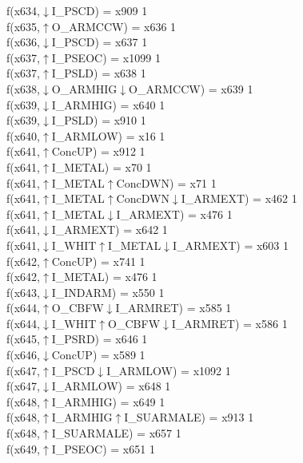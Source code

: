 f(x634,$\downarrow$I\_PSCD) = x909 {1} \\
f(x635,$\uparrow$O\_ARMCCW) = x636 {1} \\
f(x636,$\downarrow$I\_PSCD) = x637 {1} \\
f(x637,$\uparrow$I\_PSEOC) = x1099 {1} \\
f(x637,$\uparrow$I\_PSLD) = x638 {1} \\
f(x638,$\downarrow$O\_ARMHIG$\downarrow$O\_ARMCCW) = x639 {1} \\
f(x639,$\downarrow$I\_ARMHIG) = x640 {1} \\
f(x639,$\downarrow$I\_PSLD) = x910 {1} \\
f(x640,$\uparrow$I\_ARMLOW) = x16 {1} \\
f(x641,$\uparrow$ConcUP) = x912 {1} \\
f(x641,$\uparrow$I\_METAL) = x70 {1} \\
f(x641,$\uparrow$I\_METAL$\uparrow$ConcDWN) = x71 {1} \\
f(x641,$\uparrow$I\_METAL$\uparrow$ConcDWN$\downarrow$I\_ARMEXT) = x462 {1} \\
f(x641,$\uparrow$I\_METAL$\downarrow$I\_ARMEXT) = x476 {1} \\
f(x641,$\downarrow$I\_ARMEXT) = x642 {1} \\
f(x641,$\downarrow$I\_WHIT$\uparrow$I\_METAL$\downarrow$I\_ARMEXT) = x603 {1} \\
f(x642,$\uparrow$ConcUP) = x741 {1} \\
f(x642,$\uparrow$I\_METAL) = x476 {1} \\
f(x643,$\downarrow$I\_INDARM) = x550 {1} \\
f(x644,$\uparrow$O\_CBFW$\downarrow$I\_ARMRET) = x585 {1} \\
f(x644,$\downarrow$I\_WHIT$\uparrow$O\_CBFW$\downarrow$I\_ARMRET) = x586 {1} \\
f(x645,$\uparrow$I\_PSRD) = x646 {1} \\
f(x646,$\downarrow$ConcUP) = x589 {1} \\
f(x647,$\uparrow$I\_PSCD$\downarrow$I\_ARMLOW) = x1092 {1} \\
f(x647,$\downarrow$I\_ARMLOW) = x648 {1} \\
f(x648,$\uparrow$I\_ARMHIG) = x649 {1} \\
f(x648,$\uparrow$I\_ARMHIG$\uparrow$I\_SUARMALE) = x913 {1} \\
f(x648,$\uparrow$I\_SUARMALE) = x657 {1} \\
f(x649,$\uparrow$I\_PSEOC) = x651 {1} \\
